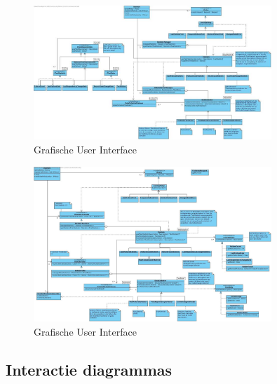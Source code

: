 \documentclass[i1]{oss}
\begin{document}
\begin{figure}[tbp]
\begin{center}
    \includegraphics[width=0.8\textwidth]{klassendiagram}
    \caption{Grafische User Interface}
	\label{fig:gui}
\end{center}
\end{figure}




\begin{figure}[tbp]
\begin{center}
    \includegraphics[width=0.8\textwidth]{klassendiagram3}
    \caption{Grafische User Interface}
	\label{fig:gui}
\end{center}
\end{figure}


\subsection{Interactie diagrammas}
\label{ssec:Interactiedia}







\end{document}
